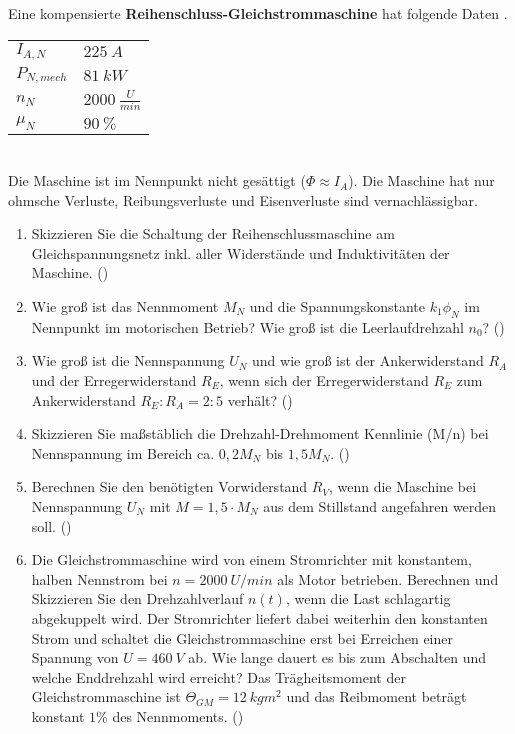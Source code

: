 \begin{question}[section=2,name={21.2.2017},mode=exm,type=bsp,tags={20170221}]
	Eine kompensierte \textbf{Reihenschluss-Gleichstrommaschine} hat folgende Daten .
	\begin{tabular}{L{2cm}l}
		$I_{A,N}$ \dotfill &$225~A$\\
		$P_{N,mech}$ \dotfill & $81~kW$ \\
		$n_N$ \dotfill & $2000~\frac{U}{min}$\\
		$\mu_{N}$ \dotfill & $90~\%$\\
	\end{tabular}\\
	Die Maschine ist im Nennpunkt nicht gesättigt ($\Phi \approx I_A$). Die Maschine hat nur ohmsche Verluste, Reibungsverluste und Eisenverluste sind vernachlässigbar.
	\begin{enumerate}
		\item Skizzieren Sie die Schaltung der Reihenschlussmaschine am Gleichspannungsnetz inkl. aller Widerstände und Induktivitäten der Maschine. ()
		\item Wie groß ist das Nennmoment $M_N$ und die Spannungskonstante $k_1 \phi_N$ im Nennpunkt im motorischen Betrieb? Wie groß ist die Leerlaufdrehzahl $n_0$? ()
		\item Wie groß ist die Nennspannung $U_N$ und wie groß ist der Ankerwiderstand $R_A$ und der Erregerwiderstand $R_E$, wenn sich der Erregerwiderstand $R_E$ zum Ankerwiderstand $R_E:R_A = 2:5$ verhält? ()
		\item Skizzieren Sie maßstäblich die Drehzahl-Drehmoment Kennlinie (M/n) bei Nennspannung im Bereich ca. $0,2 M_N$ bis $1,5 M_N$. ()
		\item Berechnen Sie den benötigten Vorwiderstand $R_V$, wenn die Maschine bei Nennspannung $U_N$ mit $M=1,5 \cdot M_N$ aus dem Stillstand angefahren werden soll. ()
		\item Die Gleichstrommaschine wird von einem Stromrichter mit konstantem, halben Nennstrom bei $n=2000~U/min$ als Motor betrieben. Berechnen und Skizzieren Sie den Drehzahlverlauf $n(t)$, wenn die Last schlagartig abgekuppelt wird. Der Stromrichter liefert dabei weiterhin den konstanten Strom und schaltet die Gleichstrommaschine erst bei Erreichen einer Spannung von $U=460~V$ ab. Wie lange dauert es bis zum Abschalten und welche Enddrehzahl wird erreicht? Das Trägheitsmoment der Gleichstrommaschine ist $\Theta_{GM} = 12~kgm^2$ und das Reibmoment beträgt konstant $1 \%$ des Nennmoments. ()
	\end{enumerate}
\end{question}
\begin{solution}
	
\end{solution}